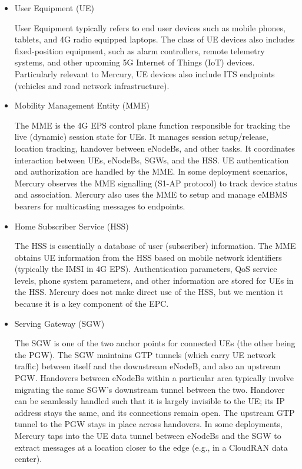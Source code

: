 \begin{itemize}

\item User Equipment (UE)

User Equipment typically refers to end user devices such as mobile
phones, tablets, and 4G radio equipped laptops.  The class of UE
devices also includes fixed-position equipment, such as alarm
controllers, remote telemetry systems, and other upcoming 5G Internet
of Things (IoT) devices. Particularly relevant to Mercury, UE devices
also include ITS endpoints (vehicles and road network infrastructure).

\item Mobility Management Entity (MME)

The MME is the 4G EPS control plane function responsible for tracking
the live (dynamic) session state for UEs. It manages session
setup/release, location tracking, handover between eNodeBs, and other
tasks. It coordinates interaction between UEs, eNodeBs, SGWs, and the
HSS. UE authentication and authorization are handled by the MME. In
some deployment scenarios, Mercury observes the MME signalling (S1-AP
protocol) to track device status and association.  Mercury also uses
the MME to setup and manage eMBMS bearers for multicasting messages to
endpoints.

\item Home Subscriber Service (HSS)

The HSS is essentially a database of user (subscriber) information.
The MME obtains UE information from the HSS based on mobile network
identifiers (typically the IMSI in 4G EPS). Authentication parameters,
QoS service levels, phone system parameters, and other information are
stored for UEs in the HSS.  Mercury does not make direct use of the
HSS, but we mention it because it is a key component of the EPC.

\item Serving Gateway (SGW)

The SGW is one of the two anchor points for connected UEs (the other
being the PGW). The SGW maintains GTP tunnels (which carry UE network
traffic) between itself and the downstream eNodeB, and also an
upstream PGW. Handovers between eNodeBs within a particular area
typically involve migrating the same SGW's downstream tunnel between
the two.  Handover can be seamlessly handled such that it is largely
invisible to the UE; its IP address stays the same, and its
connections remain open.  The upstream GTP tunnel to the PGW stays in
place across handovers.  In some deployments, Mercury taps into the UE
data tunnel between eNodeBs and the SGW to extract messages at a
location closer to the edge (e.g., in a CloudRAN data center).


\end{itemize}

